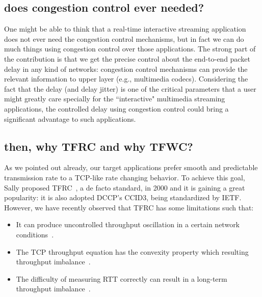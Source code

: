 
\subsection{does congestion control ever needed?}

One might be able to think that a real-time interactive streaming application
does not ever need the congestion control mechanisms, but in fact we can do much
things using congestion control over those applications. The strong part of the
contribution is that we get the precise control about the end-to-end packet
delay in any kind of networks: congestion control mechanisms can provide the
relevant information to upper layer (e.g., multimedia codecs). Considering the
fact that the delay (and delay jitter) is one of the critical parameters that a
user might greatly care specially for the ``interactive" multimedia streaming
applications, the controlled delay using congestion control could bring a
significant advantage to such applications.

\subsection{then, why TFRC and why TFWC?}

As we pointed out already, our target applications prefer smooth and predictable
transmission rate to a TCP-like rate changing behavior. To achieve this goal,
Sally proposed TFRC~\cite{FHPW00}, a de facto standard, in 2000 and it is
gaining a great popularity: it is also adopted DCCP's CCID3, being standardized
by IETF.  However, we have recently observed that TFRC has some limitations such
that:

\vspace{-0.2in}
\begin{itemize}

\item It can produce uncontrolled throughput oscillation in a certain network
conditions~\cite{CH07}.

\item The TCP throughput equation has the convexity property which
resulting throughput imbalance~\cite{RX07}.

\item The difficulty of measuring RTT correctly can result in a long-term 
throughput imbalance~\cite{AS06}.

\end{itemize}

